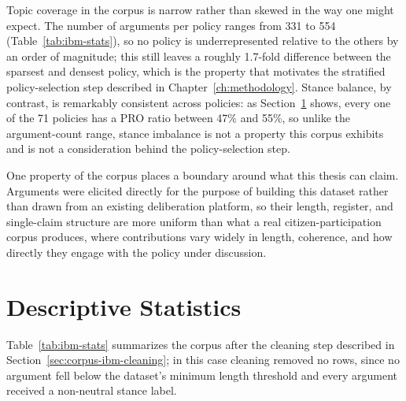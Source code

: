 Topic coverage in the corpus is narrow rather than skewed in the way one might expect. The number
of arguments per policy ranges from 331 to 554 (Table~\ref{tab:ibm-stats}), so no policy is
underrepresented relative to the others by an order of magnitude; this still leaves a roughly
1.7-fold difference between the sparsest and densest policy, which is the property that motivates
the stratified policy-selection step described in Chapter~\ref{ch:methodology}. Stance balance,
by contrast, is remarkably consistent across policies: as Section~\ref{sec:corpus-ibm-stats}
shows, every one of the 71 policies has a PRO ratio between 47\% and 55\%, so unlike the
argument-count range, stance imbalance is not a property this corpus exhibits and is not a
consideration behind the policy-selection step.

One property of the corpus places a boundary around what this thesis can claim. Arguments were
elicited directly for the purpose of building this dataset rather than drawn from an existing
deliberation platform, so their length, register, and single-claim structure are more uniform than
what a real citizen-participation corpus produces, where contributions vary widely in length,
coherence, and how directly they engage with the policy under discussion.

\section{Descriptive Statistics}
\label{sec:corpus-ibm-stats}

Table~\ref{tab:ibm-stats} summarizes the corpus after the cleaning step described in
Section~\ref{sec:corpus-ibm-cleaning}; in this case cleaning removed no rows, since no argument
fell below the dataset's minimum length threshold and every argument received a non-neutral
stance label.


